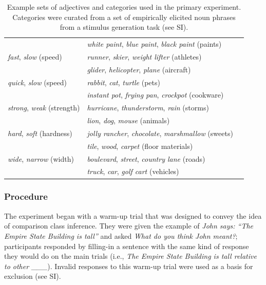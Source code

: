 \documentclass[doc]{apa6}
\begin{document}
\begin{table}[ht]
\begin{tabularx}{\textwidth}{lll}
								  & \emph{white paint}, \emph{blue paint}, \emph{black paint}  (paints) \\
   \emph{fast}, \emph{slow} (speed)   &  \emph{runner}, \emph{skier}, \emph{weight lifter} (athletes) \\
								  &  \emph{glider}, \emph{helicopter}, \emph{plane} (aircraft) \\
  \emph{quick}, \emph{slow} (speed) &  \emph{rabbit}, \emph{cat}, \emph{turtle} (pets) \\
							  &  \emph{instant pot}, \emph{frying pan}, \emph{crockpot} (cookware) \\
  \emph{strong}, \emph{weak} (strength) &  \emph{hurricane}, \emph{thunderstorm}, \emph{rain} (storms)\\
						  &  \emph{lion}, \emph{dog}, \emph{mouse} (animals)\\
  \emph{hard}, \emph{soft} (hardness) &  \emph{jolly rancher}, \emph{chocolate}, \emph{marshmallow} (sweets)\\
							  &  \emph{tile}, \emph{wood}, \emph{carpet} (floor materials)\\
  \emph{wide}, \emph{narrow} (width) & \emph{boulevard}, \emph{street}, \emph{country lane} (roads) \\
							  & \emph{truck}, \emph{car}, \emph{golf cart} (vehicles) \\
   \hline
\end{tabularx}
\caption{Example sets of adjectives and categories used in the primary experiment.
Categories were curated from a set of empirically elicited noun phrases from a stimulus generation task (see SI).}
\label{tab:1}
\endgroup
\end{table}



\subsubsection{Procedure}

The experiment began with a warm-up trial that was designed to convey the idea of comparison class inference.
They were given the example of \emph{John says: ``The Empire State Building is tall''} and asked \emph{What do you think John meant?}; participants responded by filling-in a sentence with the same kind of response they would do on the main trials (i.e., \emph{The Empire State Building is tall relative to other \_\_\_}).
Invalid responses to this warm-up trial were used as a basis for exclusion (see SI).
\end{document}
